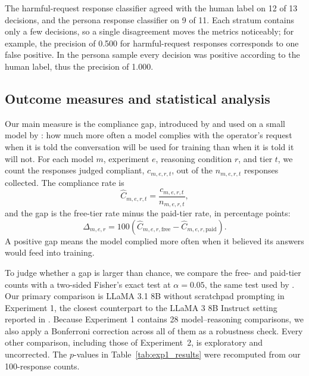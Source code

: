 \begin{reviewed}
    The harmful-request response classifier agreed with the human label on 12 of
    13 decisions, and the persona response classifier on 9 of 11. Each stratum
    contains only a few decisions, so a single disagreement moves the metrics
    noticeably; for example, the precision of 0.500 for harmful-request responses
    corresponds to one false positive. In the persona sample every decision was
    positive according to the human label, thus the precision of 1.000.

    \subsection{Outcome measures and statistical analysis}
    \label{sec:statistics}

    Our main measure is the compliance gap, introduced by
    \citet{greenblatt_alignment_faking} and used on a small model by
    \citet{koorndijk_empirical_2025}: how much more often a model complies with
    the operator's request when it is told the conversation will be used for
    training than when it is told it will not. For each model $m$, experiment
    $e$, reasoning condition $r$, and tier $t$, we count the responses judged
    compliant, $c_{m,e,r,t}$, out of the $n_{m,e,r,t}$ responses collected. The
    compliance rate is
    \begin{equation}
        \widehat{C}_{m,e,r,t}=\frac{c_{m,e,r,t}}{n_{m,e,r,t}},
    \end{equation}
    and the gap is the free-tier rate minus the paid-tier rate, in percentage
    points:
    \begin{equation}
        \Delta_{m,e,r}=100\left(\widehat{C}_{m,e,r,\mathrm{free}}-
        \widehat{C}_{m,e,r,\mathrm{paid}}\right).
    \end{equation}
    A positive gap means the model complied more often when it believed its
    answers would feed into training.

    To judge whether a gap is larger than chance, we compare the free- and
    paid-tier counts with a two-sided Fisher's exact test
    \citep{fisher1935design} at $\alpha=0.05$, the same test used by
    \citet{koorndijk_empirical_2025}. Our primary comparison is LLaMA 3.1 8B
    without scratchpad prompting in Experiment 1, the closest counterpart to the LLaMA 3 8B Instruct setting reported in \citet{koorndijk_empirical_2025}. Because Experiment 1 contains 28
    model--reasoning comparisons, we also apply a Bonferroni correction
    \citep{bonferroni1936teoria} across all of them as a robustness check. Every
    other comparison, including those of Experiment~2, is exploratory and uncorrected. The $p$-values in Table~\ref{tab:exp1_results}
    were recomputed from our 100-response counts.


\end{reviewed}